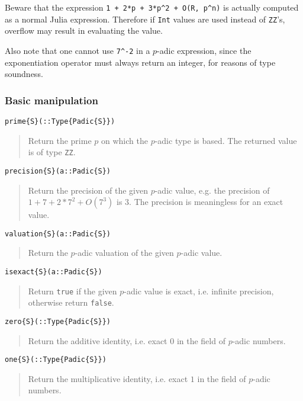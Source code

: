 \documentclass[a4paper,10pt]{article}
\newcommand{\code}{\lstinline}
\newcommand{\desc}[1]{\vspace{-3mm}\begin{quote}#1\end{quote}}
\begin{document}
{{Beware that the expression \code{1 + 2*p + 3*p^2 + O(R, p^n)} is actually computed as
a normal Julia expression. Therefore if \code{Int} values are used instead of
\code{ZZ}'s, overflow may result in evaluating the value.

Also note that one cannot use \code{7^-2} in a $p$-adic expression, since the 
exponentiation operator must always return an integer, for reasons of type soundness.

\subsubsection{Basic manipulation}

\begin{lstlisting}
prime{S}(::Type{Padic{S}})
\end{lstlisting}

\desc{Return the prime $p$ on which the $p$-adic type is based. The returned
value is of type \code{ZZ}.}

\begin{lstlisting}
precision{S}(a::Padic{S})
\end{lstlisting}

\desc{Return the precision of the given $p$-adic value, e.g. the precision of
$1 + 7 + 2*7^2 + O(7^3)$ is $3$. The precision is meaningless for an
exact value.}

\begin{lstlisting}
valuation{S}(a::Padic{S})
\end{lstlisting}

\desc{Return the $p$-adic valuation of the given $p$-adic value.}

\begin{lstlisting}
isexact{S}(a::Padic{S})
\end{lstlisting}

\desc{Return \code{true} if the given $p$-adic value is exact, i.e. infinite
precision, otherwise return \code{false}.}

\begin{lstlisting}
zero{S}(::Type{Padic{S}})
\end{lstlisting}

\desc{Return the additive identity, i.e. exact $0$ in the field of $p$-adic
numbers.}

\begin{lstlisting}
one{S}(::Type{Padic{S}})
\end{lstlisting}

\desc{Return the multiplicative identity, i.e. exact $1$ in the field of
$p$-adic numbers.}

}}
\end{document}
